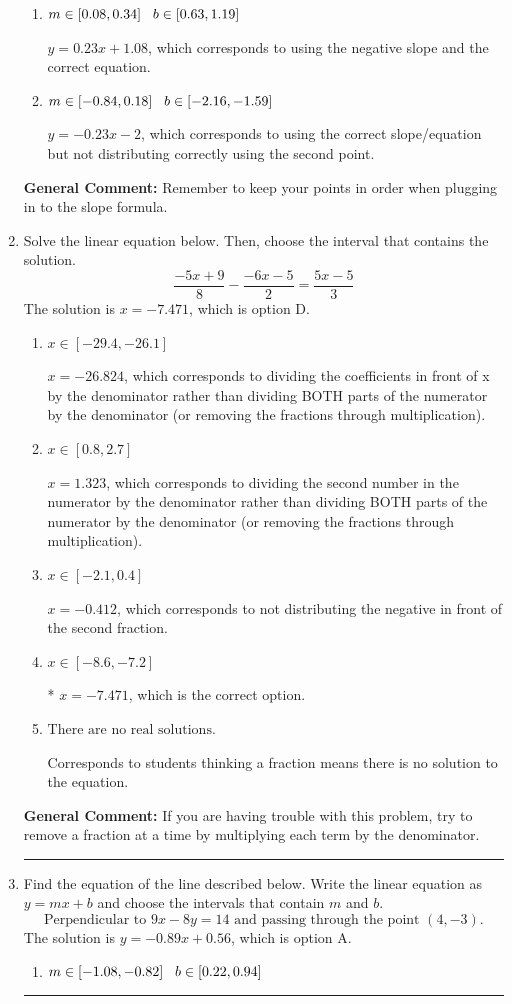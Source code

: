 \documentclass{extbook}[14pt]
\newcommand{\litem}[1]{\item #1

\rule{\textwidth}{0.4pt}}
\begin{document}
\begin{enumerate}
{\begin{enumerate}[label=\Alph*.]
* $y = -0.23x + 2.92$, which is the correct option.
\item \( m \in [0.08, 0.34] \hspace*{3mm} b \in [0.63, 1.19] \)

 $y = 0.23x + 1.08$, which corresponds to using the negative slope and the correct equation.
\item \( m \in [-0.84, 0.18] \hspace*{3mm} b \in [-2.16, -1.59] \)

 $y = -0.23x -2$, which corresponds to using the correct slope/equation but not distributing correctly using the second point.
\end{enumerate}

\textbf{General Comment:} Remember to keep your points in order when plugging in to the slope formula.
}
\litem{
Solve the linear equation below. Then, choose the interval that contains the solution.
\[ \frac{-5x + 9}{8} - \frac{-6x -5}{2} = \frac{5x -5}{3} \]
The solution is \( x = -7.471 \), which is option D.\begin{enumerate}[label=\Alph*.]
\item \( x \in [-29.4, -26.1] \)

 $x = -26.824$, which corresponds to dividing the coefficients in front of x by the denominator rather than dividing BOTH parts of the numerator by the denominator (or removing the fractions through multiplication).
\item \( x \in [0.8, 2.7] \)

 $x = 1.323$, which corresponds to dividing the second number in the numerator by the denominator rather than dividing BOTH parts of the numerator by the denominator (or removing the fractions through multiplication).
\item \( x \in [-2.1, 0.4] \)

 $x = -0.412$, which corresponds to not distributing the negative in front of the second fraction.
\item \( x \in [-8.6, -7.2] \)

* $x = -7.471$, which is the correct option.
\item \( \text{There are no real solutions.} \)

Corresponds to students thinking a fraction means there is no solution to the equation.
\end{enumerate}

\textbf{General Comment:} If you are having trouble with this problem, try to remove a fraction at a time by multiplying each term by the denominator.
}
\litem{
Find the equation of the line described below. Write the linear equation as $ y=mx+b $ and choose the intervals that contain $m$ and $b$.
\[ \text{Perpendicular to } 9 x - 8 y = 14 \text{ and passing through the point } (4, -3). \]
The solution is \( y = -0.89x + 0.56 \), which is option A.\begin{enumerate}[label=\Alph*.]
\item \( m \in [-1.08, -0.82] \hspace*{3mm} b \in [0.22, 0.94] \)


\end{enumerate}}
\end{enumerate}
\end{document}
